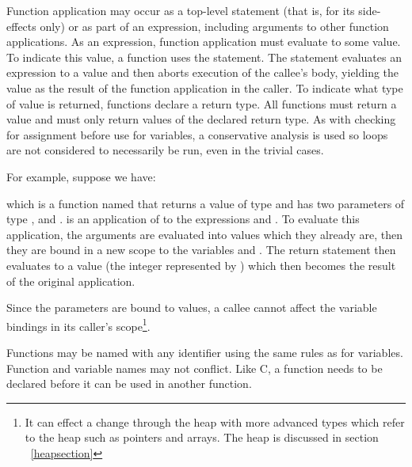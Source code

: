 \grmfundecl

\grmfundef
\grammarend

Function application may occur as a top-level statement (that is, for its
side-effects only) or as part of an expression, including arguments to other
function applications. As an expression, function application must evaluate to
some value. To indicate this value, a function uses the 
statement. The  statement evaluates an expression to a value
and then aborts execution of the callee's body, yielding the value as the result
of the function application in the caller. To indicate what type of value is
returned, functions declare a return type. All functions must return a value and
must only return values of the declared return type. As with checking for
assignment before use for variables, a conservative analysis is used so loops
are not considered to necessarily be run, even in the trivial cases.

\grammarbegin
\grmcallexpr

\grmcallstm
\grammarend

For example, suppose we have:


which is a function named  that returns a value of type
 and has two parameters of type ,  and
.  is an application of  to
the expressions  and . To evaluate this application, the
arguments are evaluated into values which they already are, then they are bound
in a new scope to the variables  and . The return
statement then evaluates  to a value (the integer represented by
) which then becomes the result of the original application.

Since the parameters are bound to values, a callee cannot affect the variable
bindings in its caller's scope\footnote{It can effect a change through the heap
with more advanced types which refer to the heap such as pointers and arrays.
The heap is discussed in section ~\ref{heapsection}}.

Functions may be named with any identifier using the same rules as for
variables. Function and variable names may not conflict. Like C, a function
needs to be declared before it can be used in another function.


